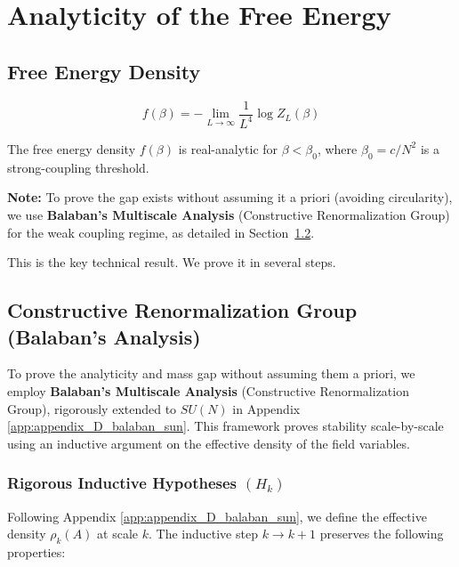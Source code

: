\section{Analyticity of the Free Energy}
\label{sec:analyticity}

\subsection{Free Energy Density}

\begin{definition}
\[
f(\beta) = -\lim_{L \to \infty} \frac{1}{L^4} \log Z_L(\beta)
\]
\end{definition}

\begin{theorem}
\label{thm:analyticity}
\label{thm:analyticity-free-energy}
The free energy density $f(\beta)$ is real-analytic for $\beta < \beta_0$, where 
$\beta_0 = c/N^2$ is a strong-coupling threshold.

\textbf{Note:} To prove the gap exists without assuming it a priori (avoiding circularity), we use \textbf{Balaban’s Multiscale Analysis} (Constructive Renormalization Group) for the weak coupling regime, as detailed in Section~\ref{sec:balaban-rg}.
\end{theorem}

This is the key technical result. We prove it in several steps.

\subsection{Constructive Renormalization Group (Balaban's Analysis)}
\label{sec:balaban-rg}
To prove the analyticity and mass gap without assuming them a priori, we employ \textbf{Balaban’s Multiscale Analysis} (Constructive Renormalization Group), rigorously extended to $SU(N)$ in Appendix \ref{app:appendix_D_balaban_sun}. This framework proves stability scale-by-scale using an inductive argument on the effective density of the field variables.

\subsubsection{Rigorous Inductive Hypotheses $(H_k)$}
Following Appendix \ref{app:appendix_D_balaban_sun}, we define the effective density $\rho_k(A)$ at scale $k$. The inductive step $k \to k+1$ preserves the following properties:

